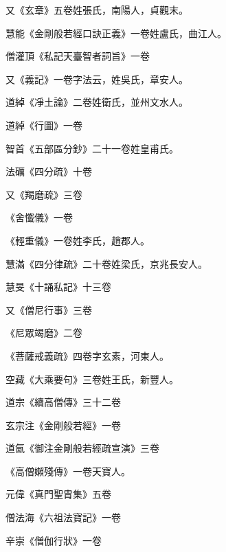 \begin{pinyinscope}
 又《玄章》五卷姓張氏，南陽人，貞觀末。



 慧能《金剛般若經口訣正義》一卷姓盧氏，曲江人。



 僧灌頂《私記天臺智者詞旨》一卷



 又《義記》一卷字法云，姓吳氏，章安人。



 道綽《凈土論》二卷姓衛氏，並州文水人。



 道綽《行圖》一卷



 智首《五部區分鈔》二十一卷姓皇甫氏。



 法礪《四分疏》十卷



 又《羯磨疏》三卷



 《舍懺儀》一卷



 《輕重儀》一卷姓李氏，趙郡人。



 慧滿《四分律疏》二十卷姓梁氏，京兆長安人。



 慧旻《十誦私記》十三卷



 又《僧尼行事》三卷



 《尼眾竭磨》二卷



 《菩薩戒義疏》四卷字玄素，河東人。



 空藏《大乘要句》三卷姓王氏，新豐人。



 道宗《續高僧傳》三十二卷



 玄宗注《金剛般若經》一卷



 道氤《御注金剛般若經疏宣演》三卷



 《高僧嬾殘傳》一卷天寶人。



 元偉《真門聖胄集》五卷



 僧法海《六祖法寶記》一卷



 辛崇《僧伽行狀》一卷




\end{pinyinscope}
